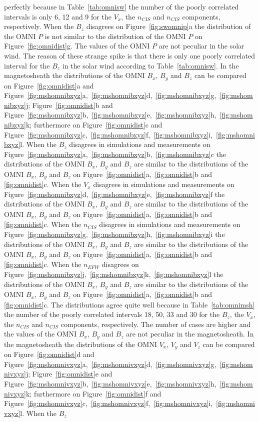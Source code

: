 \documentclass[linenumbers,draft]{agujournal}
\begin{document}
perfectly because in Table~\ref{tab:omnisw} the number of the poorly correlated intervals is only 6, 12 and 9 for the $V_{x}$, the $n_{CIS}$ and $n_{CIS}$ components, respectively. When the $B_{z}$ disagrees on Figure~\ref{fig:swomnip}a the distribution of the OMNI $P$ is not similar to the distribution of the OMNI $P$ on Figure~\ref{fig:omnidist}g. The values of the OMNI $P$ are not peculiar in the solar wind. The reason of these strange spike is that there is only one poorly correlated interval for the $B_{z}$ in the solar wind according to Table~\ref{tab:omnisw}. In the magnetosheath the distributions of the OMNI $B_{x}$, $B_{y}$ and $B_{z}$ can be compared on Figure~\ref{fig:omnidist}a and Figure~\ref{fig:mshomnibxyz}a,~\ref{fig:mshomnibxyz}d,~\ref{fig:mshomnibxyz}g,~\ref{fig:mshomnibxyz}j; Figure~\ref{fig:omnidist}b and Figure~\ref{fig:mshomnibxyz}b,~\ref{fig:mshomnibxyz}e,~\ref{fig:mshomnibxyz}h,~\ref{fig:mshomnibxyz}k; furthermore on Figure~\ref{fig:omnidist}c and Figure~\ref{fig:mshomnibxyz}c,~\ref{fig:mshomnibxyz}f,~\ref{fig:mshomnibxyz}i,~\ref{fig:mshomnibxyz}l. When the $B_{z}$ disagrees in simulations and measurements on Figure~\ref{fig:mshomnibxyz}a,~\ref{fig:mshomnibxyz}b,~\ref{fig:mshomnibxyz}c the distributions of the OMNI $B_{x}$, $B_{y}$ and $B_{z}$ are similar to the distributions of the OMNI $B_{x}$, $B_{y}$ and $B_{z}$ on Figure~\ref{fig:omnidist}a,~\ref{fig:omnidist}b and \ref{fig:omnidist}c. When the $V_{x}$ disagrees in simulations and measurements on Figure~\ref{fig:mshomnibxyz}d,~\ref{fig:mshomnibxyz}e,~\ref{fig:mshomnibxyz}f the distributions of the OMNI $B_{x}$, $B_{y}$ and $B_{z}$ are similar to the distributions of the OMNI $B_{x}$, $B_{y}$ and $B_{z}$ on Figure~\ref{fig:omnidist}a,~\ref{fig:omnidist}b and \ref{fig:omnidist}c. When the $n_{CIS}$ disagrees in simulations and measurements on Figure~\ref{fig:mshomnibxyz}g,~\ref{fig:mshomnibxyz}h,~\ref{fig:mshomnibxyz}i the distributions of the OMNI $B_{x}$, $B_{y}$ and $B_{z}$ are similar to the distributions of the OMNI $B_{x}$, $B_{y}$ and $B_{z}$ on Figure~\ref{fig:omnidist}a,~\ref{fig:omnidist}b and \ref{fig:omnidist}c. When the $n_{EFW}$ disagrees on Figure~\ref{fig:mshomnibxyz}j,~\ref{fig:mshomnibxyz}k,~\ref{fig:mshomnibxyz}l the distributions of the OMNI $B_{x}$, $B_{y}$ and $B_{z}$ are similar to the distributions of the OMNI $B_{x}$, $B_{y}$ and $B_{z}$ on Figure~\ref{fig:omnidist}a,~\ref{fig:omnidist}b and \ref{fig:omnidist}c. The distributions agree quite well because in Table~\ref{tab:omnimsh} the number of the poorly correlated intervals 18, 50, 33 and 30 for the $B_{z}$, the $V_{x}$, the $n_{CIS}$ and $n_{CIS}$ components, respectively. The number of cases are higher and the values of the OMNI $B_{x}$, $B_{y}$ and $B_{z}$ are not peculiar in the magnetosheath. In the magnetosheath the distributions of the OMNI $V_{x}$, $V_{y}$ and $V_{z}$ can be compared on Figure~\ref{fig:omnidist}d and Figure~\ref{fig:mshomnivxyz}a,~\ref{fig:mshomnivxyz}d,~\ref{fig:mshomnivxyz}g,~\ref{fig:mshomnivxyz}j; Figure~\ref{fig:omnidist}e and Figure~\ref{fig:mshomnivxyz}b,~\ref{fig:mshomnivxyz}e,~\ref{fig:mshomnivxyz}h,~\ref{fig:mshomnivxyz}k; furthermore on Figure~\ref{fig:omnidist}f and Figure~\ref{fig:mshomnivxyz}c,~\ref{fig:mshomnivxyz}f,~\ref{fig:mshomnivxyz}i,~\ref{fig:mshomnivxyz}l. When the $B_{z}$ 
\end{document}
